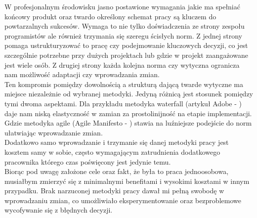 W profesjonalnym środowisku jasno postawione wymagania jakie ma spełniać końcowy produkt oraz twardo określony schemat pracy są kluczem do powtarzalnych sukcesów. Wymaga to nie tylko doświadczenia ze strony zespołu programistów ale również trzymania się szeregu ścisłych norm. Z jednej strony pomaga ustrukturyzować to pracę czy podejmowanie kluczowych decyzji, co jest szczególnie potrzebne przy dużych projektach lub gdzie w projekt zaangażowane jest wiele osób. Z drugiej strony każda kolejna norma czy wytyczna ogranicza nam możliwość adaptacji czy wprowadzania zmian.\\

Ten kompromis pomiędzy dowolnością a strukturą dającą twarde wytyczne ma miejsce niezależnie od wybranej metodyki. Jedyną różnicą jest stosunek pomiędzy tymi dwoma aspektami. Dla przykładu metodyka waterfall (artykuł Adobe - \cite{waterfall}) daje nam niską elastyczność w zamian za prostolinijność na etapie implementacji. Gdzie metodyka agile (Agile Manifesto - \cite{agilemanifesto}) stawia na luźniejsze podejście do norm ułatwiając wprowadzanie zmian.\\

Dodatkowo samo wprowadzanie i trzymanie się danej metodyki pracy jest kosztem samy w sobie, często wymagającym zatrudnienia dodatkowego pracownika którego czas poświęcony jest jedynie temu.\\

Biorąc pod uwagę założone cele oraz fakt, że była to praca jednoosobowa, musiałbym zmierzyć się z minimalnymi benefitami i wysokimi kosztami w innym przypadku. Brak narzuconej metodyki pracy dawał mi pełną swobodę w wprowadzaniu zmian, co umożliwiało eksperymentowanie oraz bezproblemowe wycofywanie się z błędnych decyzji.